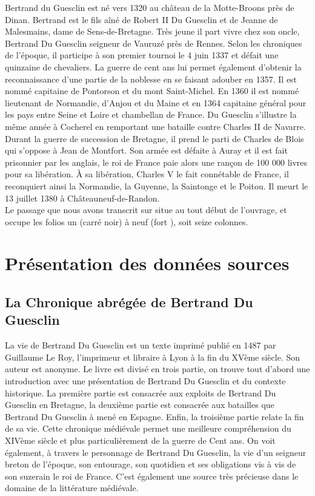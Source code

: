 \documentclass{article}
\begin{document}
	Bertrand du Guesclin est né vers 1320 au château de la Motte-Broons près de Dinan. 
Bertrand est le fils aîné de Robert II Du Guesclin et de Jeanne de Malesmains, dame de Sens-de-Bretagne. Très jeune il part vivre chez son oncle, Bertrand Du Guesclin seigneur de Vauruzé près de Rennes. Selon les chroniques de l'époque, il participe à son premier tournoi le 4 juin 1337 et défait une quinzaine de chevaliers. La guerre de cent ans lui permet également d’obtenir la reconnaissance d’une partie de la noblesse en se faisant adouber en 1357. Il est nommé capitaine de Pontorson et du mont Saint-Michel. En 1360 il est nommé lieutenant de Normandie, d’Anjou et du Maine et en 1364 capitaine général pour les pays entre Seine et Loire et chambellan de France. Du Guesclin s’illustre la même année à Cocherel en remportant une bataille contre Charles II de Navarre. Durant la guerre de succession de Bretagne, il prend le parti de Charles de Blois qui s’oppose à Jean de Montfort. Son armée est défaite à Auray et il est fait prisonnier par les anglais, le roi de France paie alors une rançon de 100 000 livres pour sa libération. À sa libération, Charles V le fait connétable de France, il reconquiert ainsi la Normandie, la Guyenne, la Saintonge et le Poitou. Il meurt le 13 juillet 1380 à Châteauneuf-de-Randon.\\ 

Le passage que nous avons transcrit sur situe au tout début de l’ouvrage, et occupe les folios un (carré noir) à neuf (\og fort \fg\hspace{0.5mm}), soit seize colonnes.


\section{Présentation des données sources}

\subsection{La Chronique abrégée de Bertrand Du Guesclin}

La vie de Bertrand Du Guesclin est un texte imprimé publié en 1487 par Guillaume Le Roy, l’imprimeur et libraire à Lyon à la fin du XVème siècle. Son auteur est anonyme. Le livre est divisé en trois partie, on trouve tout d'abord une introduction avec une présentation de Bertrand Du Guesclin et du contexte historique. La première partie est consacrée aux exploits de Bertrand Du Guesclin en Bretagne, la deuxième partie est consacrée aux batailles que Bertrand Du Guesclin à mené en Espagne. Enfin, la troisième partie relate la fin de sa vie. Cette chronique médiévale permet une meilleure compréhension du XIVème siècle et plus particulièrement de la guerre de Cent ans. On voit également, à travers le personnage de Bertrand Du Guesclin, la vie d'un seigneur breton de l'époque, son entourage, son quotidien et ses obligations vis à vis de son suzerain le roi de France. C'est également une source très précieuse dans le domaine de la littérature médiévale. 
\end{document}
